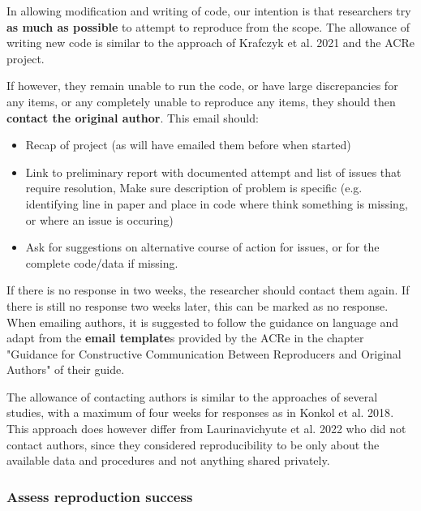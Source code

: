 In allowing modification and writing of code, our intention is that researchers try \textbf{as much as possible} to attempt to reproduce from the scope. The allowance of writing new code is similar to the approach of Krafczyk et al. 2021\autocite{krafczyk_learning_2021} and the ACRe project\autocite{berkeley_initiative_for_transparency_in_the_social_sciences_guide_2022}.

If however, they remain unable to run the code, or have large discrepancies for any items, or any completely unable to reproduce any items, they should then \textbf{contact the original author}. This email should:
\begin{itemize}
    \item Recap of project (as will have emailed them before when started)
    \item Link to preliminary report with documented attempt and list of issues that require resolution, Make sure description of problem is specific (e.g. identifying line in paper and place in code where think something is missing, or where an issue is occuring)
    \item Ask for suggestions on alternative course of action for issues, or for the complete code/data if missing.
\end{itemize}

If there is no response in two weeks, the researcher should contact them again. If there is still no response two weeks later, this can be marked as no response. When emailing authors, it is suggested to follow the guidance on language and adapt from the \textbf{email template}s provided by the ACRe in the chapter "Guidance for Constructive Communication Between Reproducers and Original Authors" of their guide.\autocite{berkeley_initiative_for_transparency_in_the_social_sciences_guide_2022}

The allowance of contacting authors is similar to the approaches of several studies,\autocite{krafczyk_learning_2021,wood_push_2018,berkeley_initiative_for_transparency_in_the_social_sciences_guide_2022,hardwicke_analytic_2021,konkol_computational_2019} with a maximum of four weeks for responses as in Konkol et al. 2018\autocite{konkol_computational_2019}. This approach does however differ from Laurinavichyute et al. 2022\autocite{laurinavichyute_share_2022} who did not contact authors, since they considered reproducibility to be only about the available data and procedures and not anything shared privately.\autocite{laurinavichyute_share_2022}

\subsubsection{Assess reproduction success}
\timeyes

